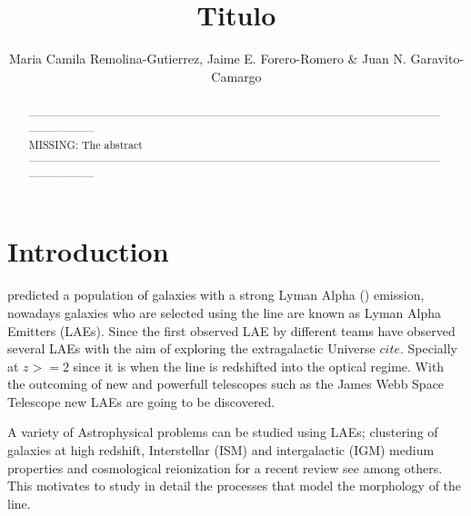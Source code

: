 \documentclass{latex/emulateapj}
\begin{document}
\title{Titulo}


\author{ Maria Camila Remolina-Gutierrez, Jaime E. Forero-Romero \& Juan N. Garavito-Camargo}


\begin{abstract}
\noindent ------------------------------------------------------------------------------------------------------------------------------------\\
MISSING: The abstract\\
------------------------------------------------------------------------------------------------------------------------------------\\
\end{abstract}

\section{Introduction}
\label{sec:intro}

\cite{PartridgePeebles} predicted a population of galaxies with a strong 
Lyman Alpha (\lya) emission,  nowadays galaxies who are selected using the \lya 
line are known as Lyman Alpha Emitters (LAEs). Since the first 
observed LAE by \cite{DjorgovskiThompson} different teams have 
observed several LAEs \cite{Kulas12, Yamada2012, Chonis2013,Finkelstein2013,Ostlin14} with the aim of  
exploring the extragalactic Universe $cite{}$.  Specially at $z>=2$ since it is when the 
line is redshifted into the optical regime. With the outcoming of new and powerfull telescopes
such as the James Webb Space Telescope new LAEs are going to be discovered.

A variety of Astrophysical problems can be studied using LAEs; clustering \citep{Behrens13}
of galaxies at high redshift, Interstellar (ISM) and intergalactic (IGM) medium 
properties \citep{DijkstraKramer} and cosmological reionization for a recent review see \cite{review} 
among others. This motivates to study in 
detail the processes that model the morphology of the \lya line.
\end{document}
